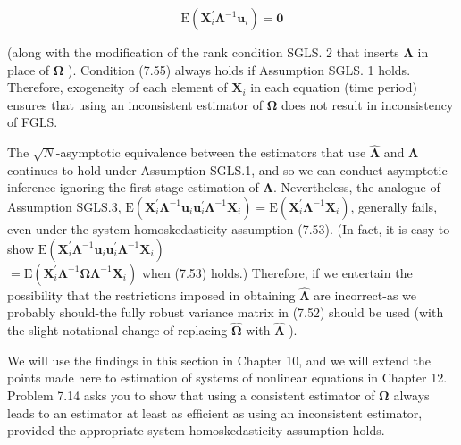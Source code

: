 \documentclass[10pt]{article}
\begin{document}
\begin{equation*}
\mathrm{E}\left(\mathbf{X}_{i}^{\prime} \boldsymbol{\Lambda}^{-1} \mathbf{u}_{i}\right)=\mathbf{0} \tag{7.55}
\end{equation*}


(along with the modification of the rank condition SGLS. 2 that inserts $\boldsymbol{\Lambda}$ in place of $\boldsymbol{\Omega}$ ). Condition (7.55) always holds if Assumption SGLS. 1 holds. Therefore, exogeneity of each element of $\mathbf{X}_{i}$ in each equation (time period) ensures that using an inconsistent estimator of $\boldsymbol{\Omega}$ does not result in inconsistency of FGLS.

The $\sqrt{N}$-asymptotic equivalence between the estimators that use $\hat{\boldsymbol{\Lambda}}$ and $\boldsymbol{\Lambda}$ continues to hold under Assumption SGLS.1, and so we can conduct asymptotic inference ignoring the first stage estimation of $\boldsymbol{\Lambda}$. Nevertheless, the analogue of Assumption SGLS.3, $\mathrm{E}\left(\mathbf{X}_{i}^{\prime} \boldsymbol{\Lambda}^{-1} \mathbf{u}_{i} \mathbf{u}_{i}^{\prime} \boldsymbol{\Lambda}^{-1} \mathbf{X}_{i}\right)=\mathrm{E}\left(\mathbf{X}_{i}^{\prime} \boldsymbol{\Lambda}^{-1} \mathbf{X}_{i}\right)$, generally fails, even under the system homoskedasticity assumption (7.53). (In fact, it is easy to show $\mathrm{E}\left(\mathbf{X}_{i}^{\prime} \boldsymbol{\Lambda}^{-1} \mathbf{u}_{i} \mathbf{u}_{i}^{\prime} \boldsymbol{\Lambda}^{-1} \mathbf{X}_{i}\right)$\\
$=\mathrm{E}\left(\mathbf{X}_{i}^{\prime} \boldsymbol{\Lambda}^{-1} \boldsymbol{\Omega} \boldsymbol{\Lambda}^{-1} \mathbf{X}_{i}\right)$ when (7.53) holds.) Therefore, if we entertain the possibility that the restrictions imposed in obtaining $\hat{\boldsymbol{\Lambda}}$ are incorrect-as we probably should-the fully robust variance matrix in (7.52) should be used (with the slight notational change of replacing $\hat{\boldsymbol{\Omega}}$ with $\hat{\boldsymbol{\Lambda}}$ ).

We will use the findings in this section in Chapter 10, and we will extend the points made here to estimation of systems of nonlinear equations in Chapter 12. Problem 7.14 asks you to show that using a consistent estimator of $\boldsymbol{\Omega}$ always leads to an estimator at least as efficient as using an inconsistent estimator, provided the appropriate system homoskedasticity assumption holds.
\end{document}
